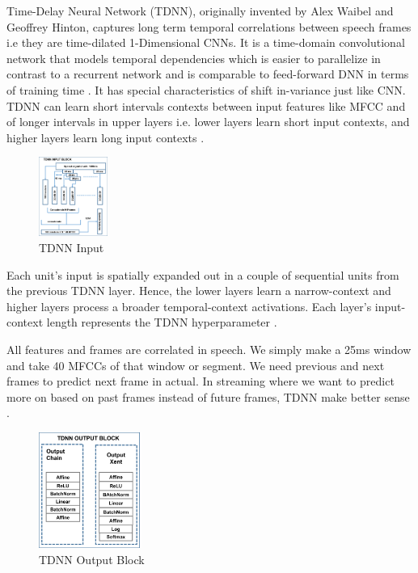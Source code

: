 Time-Delay Neural Network (TDNN), originally invented by Alex Waibel and Geoffrey Hinton, captures long term temporal correlations between speech frames i.e they are time-dilated 1-Dimensional CNNs. It is a time-domain convolutional network that models temporal dependencies which is easier to parallelize in contrast to a recurrent network and is comparable to feed-forward DNN in terms of training time \cite{noauthor_tdnn_nodate}. It has special characteristics of shift in-variance just like CNN. TDNN can learn short intervals contexts between input features like MFCC and of longer intervals in upper layers i.e. lower layers learn short input contexts, and higher layers learn long input contexts \cite{liu_time_2019}.

\begin{figure}[h!]
    \centering
    \includegraphics[width=0.2\textwidth]{img/TDNN INPUT.png}
    \caption{TDNN Input}   
    \label{fig:TDNN-INPUT}
\end{figure}

Each unit's input is spatially expanded out in a couple of sequential units from the previous TDNN layer. Hence, the lower layers learn a narrow-context and higher layers process a broader temporal-context activations. Each layer's input-context length represents the TDNN hyperparameter \cite{kreyssig_improved_2018}.

All features and frames are correlated in speech. We simply make a 25ms window and take 40 MFCCs of that window or segment. We need previous and next frames to predict next frame in actual. In streaming where we want to predict more on based on past frames instead of future frames, TDNN make better sense \cite{liu_time_2019}. 

\begin{figure}[h!]
    \centering
    \includegraphics[width=0.3\textwidth]{img/TDNNOUTPUT.png}
    \caption{TDNN Output Block}
    \label{fig:TDNN-OUTPUT-BLOC}
\end{figure}

